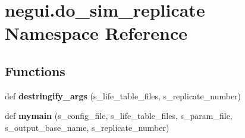 \hypertarget{namespacenegui_1_1do__sim__replicate}{}\section{negui.\+do\+\_\+sim\+\_\+replicate Namespace Reference}
\label{namespacenegui_1_1do__sim__replicate}
\subsection*{Functions}
\begin{DoxyCompactItemize}
\item 
def {\bfseries destringify\+\_\+args} (s\+\_\+life\+\_\+table\+\_\+files, s\+\_\+replicate\+\_\+number)\hypertarget{namespacenegui_1_1do__sim__replicate_af5d9dca034eb856ca903a0b5b90f6572}{}\label{namespacenegui_1_1do__sim__replicate_af5d9dca034eb856ca903a0b5b90f6572}

\item 
def {\bfseries mymain} (s\+\_\+config\+\_\+file, s\+\_\+life\+\_\+table\+\_\+files, s\+\_\+param\+\_\+file, s\+\_\+output\+\_\+base\+\_\+name, s\+\_\+replicate\+\_\+number)\hypertarget{namespacenegui_1_1do__sim__replicate_adad467779bd42d5af6ac01997f753ca1}{}\label{namespacenegui_1_1do__sim__replicate_adad467779bd42d5af6ac01997f753ca1}

\end{DoxyCompactItemize}
